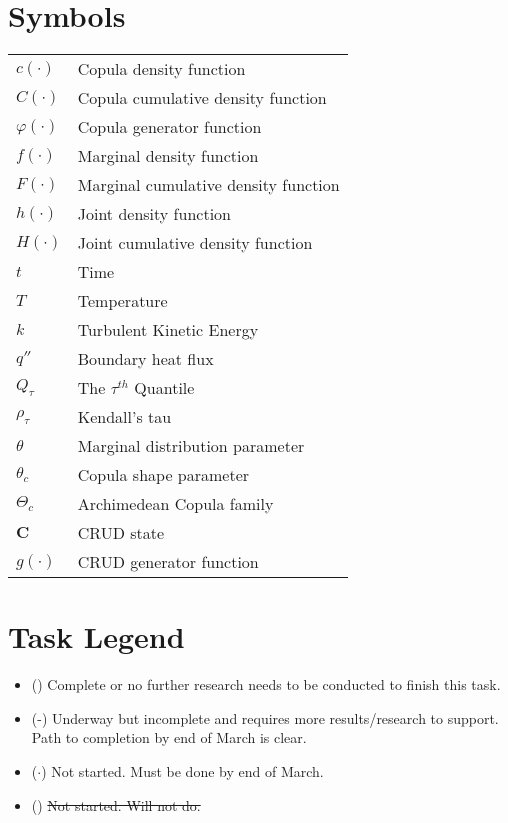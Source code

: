 \section*{Symbols}
\begin{tabular}{l l}
$c(\cdot)$ & Copula density function \\
$C(\cdot)$ & Copula cumulative density function \\
$\varphi(\cdot)$ & Copula generator function \\
$f(\cdot)$ & Marginal density function \\
$F(\cdot)$ & Marginal cumulative density function \\
$h(\cdot)$ & Joint density function \\
$H(\cdot)$ & Joint cumulative density function \\
$t$ & Time \\
$T$ & Temperature \\
$k$ & Turbulent Kinetic Energy \\
$q''$ & Boundary heat flux \\
$Q_{\tau}$ & The $\tau^{th}$ Quantile \\
$\rho_{\tau}$ & Kendall's tau \\
$\theta$ & Marginal distribution parameter \\
$\theta_c$ & Copula shape parameter \\
$\Theta_c$ & Archimedean Copula family \\
$\mathbf C$ & CRUD state \\
$g(\cdot)$ & CRUD generator function \\
\end{tabular}


\section*{Task Legend}

\begin{itemize}
    \item (\checkmark)  Complete or no further research needs to be conducted to finish this task.
    \item (\checkmark-)  Underway but incomplete and requires more results/research to support.  Path to completion by end of March is clear.
    \item ($\cdot$)  Not started.  Must be done by end of March.
    \item (\xmark)  \sout{Not started.  Will not do.}
\end{itemize}

\pagebreak
